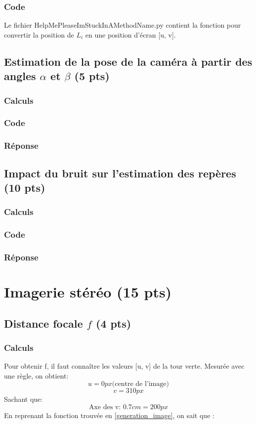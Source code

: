 \documentclass[12pt]{article}
\begin{document}
\subsubsection{Code}

Le fichier HelpMePleaseImStuckInAMethodName.py contient la fonction pour convertir la position de $L_i$ en une position d'écran [u, v].

\subsection{Estimation de la pose de la caméra à partir des angles $\alpha$ et $\beta$ (5 pts)}
\subsubsection{Calculs}
\subsubsection{Code}
\subsubsection{Réponse}

\subsection{Impact du bruit sur l'estimation des repères (10 pts)}
\subsubsection{Calculs}
\subsubsection{Code}
\subsubsection{Réponse}

\newpage
\section{Imagerie stéréo  (15 pts)}

\subsection{Distance focale $f$ (4 pts)}
\subsubsection{Calculs}
Pour obtenir f, il faut connaître les valeurs [u, v] de la tour verte.
Mesur\'ee avec une r\`egle, on obtient:
\[ u = 0 px \text{(centre de l'image)}\]
\[ v = 310 px\]
Sachant que:
\[ \text{Axe des v: } 0.7cm = 200px \]
En reprenant la fonction trouv\'ee en \ref{generation_image}, on sait que :
\end{document}

